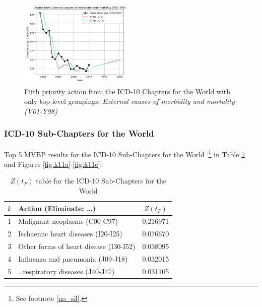 \documentclass[10pt, a4paper, twocolumn]{IEEEconf}
\begin{document}
\begin{figure}[H]
  \centering
  \includegraphics[width=0.5\textwidth]{results/WORLD_ICD10_CHAPTER_ROOTS/External_causes_of_morbidity_and_mortality_V01-Y98_ets.png}
  \caption{Fifth priority action from the ICD-10 Chapters for the World with only top-level groupings: \textit{External causes of morbidity and mortality (V01-Y98)}}\label{fig:k10e}
\end{figure}

\clearpage

\subsubsection{ICD-10 Sub-Chapters for the World}

Top 5 MVBP results for the ICD-10 Sub-Chapters for the World \citep{whomortality}\textsuperscript{,}\footnote{See footnote \ref{no_s3}.} in Table \ref{table:ztable11} and Figures \ref{fig:k11a}-\ref{fig:k11e}:

\begin{table}[H]
  \centering
  \begin{tabular}{clc}
    \toprule
      $k$ & Action (Eliminate: \ldots) & $Z(t_F)$ \\
    \midrule
      1 &                Malignant neoplasms (C00-C97) & 0.216971 \\
      2 &           Ischaemic heart diseases (I20-I25) & 0.076670 \\
      3 &       Other forms of heart disease (I30-I52) & 0.038095 \\
      4 &            Influenza and pneumonia (J09-J18) & 0.032015 \\
      5 &        \ldots respiratory diseases (J40-J47) & 0.031105 \\
    \bottomrule
  \end{tabular}
  \caption{$Z(t_F)$ table for the ICD-10 Sub-Chapters for the World}
  \label{table:ztable11}
\end{table}
\end{document}
